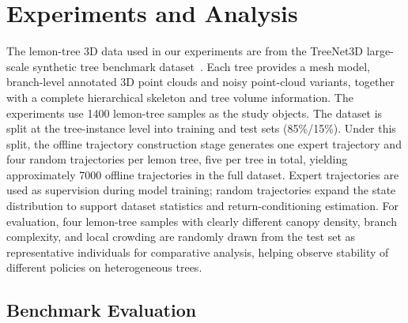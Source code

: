 \documentclass[12pt,a4paper,fontset=fandol]{ctexart}
\begin{document}
\section{Experiments and Analysis}\label{sec:experiment}
The lemon-tree 3D data used in our experiments are from the TreeNet3D large-scale synthetic tree benchmark dataset~\citep{tang2024treenet3d}.
Each tree provides a mesh model,
branch-level annotated 3D point clouds and noisy point-cloud variants,
together with a complete hierarchical skeleton and tree volume information.
The experiments use 1400 lemon-tree samples as the study objects.
The dataset is split at the tree-instance level into training and test sets (85\%/15\%).
Under this split, the offline trajectory construction stage generates one expert trajectory
and four random trajectories per lemon tree,
five per tree in total, yielding approximately 7000 offline trajectories in the full dataset.
Expert trajectories are used as supervision during model training;
random trajectories expand the state distribution to support dataset statistics and return-conditioning estimation.
For evaluation, four lemon-tree samples with clearly different canopy density, branch complexity, and local crowding are randomly drawn from the test set
as representative individuals for comparative analysis,
helping observe stability of different policies on heterogeneous trees.


\subsection{Benchmark Evaluation}
\end{document}
